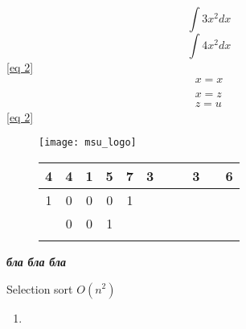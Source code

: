 \documentclass[a4paper,12pt]{article} %
\begin{document}
	\begin{equation}		
		\int 3x^2dx
		\label {eq 1}
	\end{equation}
	\[
	\int 4x^2 dx
	\]
	\eqref{eq 2}
	\begin{eqnarray}
		x = x \\ \label{eq 2} \\
		x = z \\
		z = u  
	\end{eqnarray}
	\eqref{eq 2}
	\begin{figure}[H]
		\centering
		\texttt{[image: msu\_logo]}
		\caption{}
		\label{fig:msulogo}
	\end{figure}
	\begin{figure} [H]
		\begin{tabular}{|c|c|c|c|cllllll}
			\hline
			4 & 4 & 1 & 5 & 7 & 3& & &3 & & 6 \\
			\hline
			1 & 0 & 0 & 0 & 1 & & & & & & \\
			\hline
			& 0 & 0 & 1 &  & & & & & & \\
			\hline& & & & & & & & & & 
		\end{tabular}
		\centering
	\end{figure}
	\textit{\textbf{бла бла бла}}

	\begin{center}
        Selection sort $O(n^2)$ %
    \end{center}
	\begin{enumerate}
        \item 
    \end{enumerate}
\end{document}
